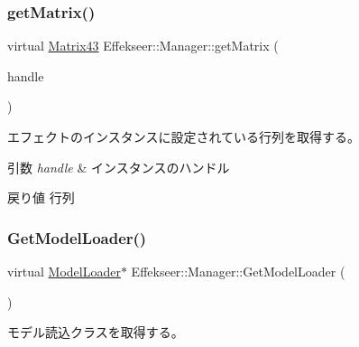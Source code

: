 \subsubsection{\texorpdfstring{get\+Matrix()}{getMatrix()}}
{\footnotesize\ttfamily virtual \mbox{\hyperlink{struct_effekseer_1_1_matrix43}{Matrix43}} Effekseer\+::\+Manager\+::get\+Matrix (\begin{DoxyParamCaption}\item[{\mbox{\hyperlink{namespace_effekseer_afba58b8d812da862190e9bbfc040824a}{Handle}}}]{handle }\end{DoxyParamCaption})\hspace{0.3cm}{\ttfamily [pure virtual]}}



エフェクトのインスタンスに設定されている行列を取得する。 


\begin{DoxyParams}{引数}
{\em handle} & インスタンスのハンドル \\
\hline
\end{DoxyParams}
\begin{DoxyReturn}{戻り値}
行列 
\end{DoxyReturn}
\mbox{\label{class_effekseer_1_1_manager_a6afd86fbdfb8b3e6d12c9a80bfb3f80e}} 
\subsubsection{\texorpdfstring{Get\+Model\+Loader()}{GetModelLoader()}}
{\footnotesize\ttfamily virtual \mbox{\hyperlink{class_effekseer_1_1_model_loader}{Model\+Loader}}$\ast$ Effekseer\+::\+Manager\+::\+Get\+Model\+Loader (\begin{DoxyParamCaption}{ }\end{DoxyParamCaption})\hspace{0.3cm}{\ttfamily [pure virtual]}}



モデル読込クラスを取得する。 

\mbox{\label{class_effekseer_1_1_manager_a6ed37b18b9e99ff77f9608da3f4db93a}} 
